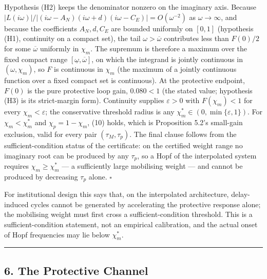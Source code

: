 \documentclass[11pt]{article}
\begin{document}
Hypothesis (H2) keeps the denominator nonzero on the imaginary axis.
Because
\(|L(i\omega)|/|(i\omega-A_N)(i\omega+d)(i\omega-C_E)| = O(\omega^{-2})\)
as \(\omega \to \infty\), and because the coefficients \(A_N, d, C_E\)
are bounded uniformly on \([0,1]\) (hypothesis (H1), continuity on a
compact set), the tail \(\omega > \overline\omega\) contributes less
than \(F(0)/2\) for some \(\overline\omega\) uniformly in \(\chi_m\).
The supremum is therefore a maximum over the fixed compact range
\([\underline\omega, \overline\omega]\), on which the integrand is
jointly continuous in \((\omega, \chi_m)\), so \(F\) is continuous in
\(\chi_m\) (the maximum of a jointly continuous function over a fixed
compact set is continuous). At the protective endpoint, \(F(0)\) is the
pure protective loop gain, \(0.080 < 1\) (the stated value; hypothesis
(H3) is its strict-margin form). Continuity supplies \(\varepsilon > 0\)
with \(F(\chi_m) < 1\) for every \(\chi_m < \varepsilon\); the
conservative threshold radius is any
\(\chi_m^* \in (0, \min\{\varepsilon, 1\})\). For \(\chi_m < \chi_m^*\)
and \(\chi_p = 1 - \chi_m\), (10) holds, which is Proposition 5.2's
small-gain exclusion, valid for every pair \((\tau_M, \tau_p)\). The
final clause follows from the sufficient-condition status of the
certificate: on the certified weight range no imaginary root can be
produced by any \(\tau_p\), so a Hopf of the interpolated system
requires \(\chi_m \ge \chi_m^*\) --- a sufficiently large mobilising
weight --- and cannot be produced by decreasing \(\tau_p\) alone. \ensuremath{\square}

For institutional design this says that, on the interpolated
architecture, delay-induced cycles cannot be generated by accelerating
the protective response alone; the mobilising weight must first cross a
sufficient-condition threshold. This is a sufficient-condition
statement, not an empirical calibration, and the actual onset of Hopf
frequencies may lie below \(\chi_m^*\).

\begin{center}\rule{0.5\linewidth}{0.5pt}\end{center}

\subsection{6. The Protective Channel}\label{the-protective-channel}
\end{document}
